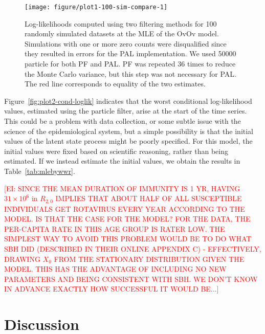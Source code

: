 \documentclass[10pt]{article}\usepackage[]{graphicx}\usepackage[]{xcolor}
\newenvironment{knitrout}{}{} %
\newcommand{\ed}[1]{\textcolor{red}{[EI: #1]}}
\begin{document}
\begin{knitrout}
\color{fgcolor}\begin{figure}

{\centering \texttt{[image: figure/plot1-100-sim-compare-1]} 

}

\caption[Log-likelihoods computed using two filtering methods for 100 randomly simulated datasets at the MLE of the OvOv model]{Log-likelihoods computed using two filtering methods for 100 randomly simulated datasets at the MLE of the OvOv model. Simulations with one or more zero counts were disqualified since they resulted in errors for the PAL implementation. We used 50000 particle for both PF and PAL. PF was repeated 36 times to reduce the Monte Carlo variance, but this step was not necessary for PAL. The red line corresponds to equality of the two estimates.}\label{fig:plot1-100-sim-compare}
\end{figure}

\end{knitrout}

Figure~\ref{fig:plot2-cond-loglik} indicates that the worst conditional log-likelihood values, estimated using the particle filter, arise at the start of the time series.
This could be a problem with data collection, or some subtle issue with the science of the epidemiological system, but a simple possibility is that the initial values of the latent state process might be poorly specified.
For this model, the initial values were fixed based on scientific reasoning, rather than being estimated.
If we instead estimate the initial values, we obtain the results in Table~\ref{tab:mlebywwr}. 

\ed{SINCE THE MEAN DURATION OF IMMUNITY IS 1 YR, HAVING $31\times 10^6$ in $R_{2,0}$ IMPLIES THAT ABOUT HALF OF ALL SUSCEPTIBLE INDIVIDUALS GET ROTAVIRUS EVERY YEAR ACCORDING TO THE MODEL. IS THAT THE CASE FOR THE MODEL? FOR THE DATA, THE PER-CAPITA RATE IN THIS AGE GROUP IS RATER LOW. THE SIMPLEST WAY TO AVOID THIS PROBLEM WOULD BE TO DO WHAT SBH DID (DESCRIBED IN THEIR ONLINE APPENDIX C) - EFFECTIVELY, DRAWING $X_0$ FROM THE STATIONARY DISTRIBUTION GIVEN THE MODEL. THIS HAS THE ADVANTAGE OF INCLUDING NO NEW PARAMETERS AND BEING CONSISTENT WITH SBH. WE DON'T KNOW IN ADVANCE EXACTLY HOW SUCCESSFUL IT WOULD BE...}

\section*{Discussion}
\end{document}
